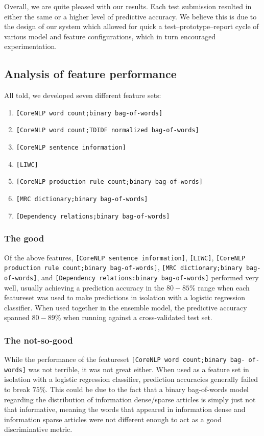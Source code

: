 \documentclass[
10pt, %
a4paper, %
oneside, %
headinclude,footinclude, %
BCOR5mm, %
]{scrartcl}
\begin{document}
Overall, we are quite pleased with our results. Each test submission resulted in
either the same or a higher level of predictive accuracy. We believe this is due
to the design of our system which allowed for quick a test--prototype--report
cycle of various model and feature configurations, which in turn encouraged
experimentation.

\subsection{Analysis of feature performance}
All told, we developed seven different feature sets: 
\begin{enumerate}
	\item \texttt{[CoreNLP word count;binary bag-of-words]} 
	\item \texttt{[CoreNLP word count;TDIDF normalized bag-of-words]} 
	\item \texttt{[CoreNLP sentence information]} 
	\item \texttt{[LIWC]}
	\item \texttt{[CoreNLP production rule count;binary bag-of-words]}
	\item \texttt{[MRC dictionary;binary bag-of-words]}
	\item \texttt{[Dependency relations;binary bag-of-words]}
\end{enumerate}

\subsubsection{The good}
Of the above features, \texttt{[CoreNLP sentence information]},
\texttt{[LIWC]}, \texttt{[CoreNLP production rule count;binary bag-of-words]}, 
\texttt{[MRC dictionary;binary bag-of-words]}, 
and \texttt{[Dependency relations:binary bag-of-words]} performed very well,
usually achieving a prediction accuracy in the $80-85\%$ range when each
featureset was used to make predictions in isolation with a logistic regression
classifier. When used together in the ensemble model, the predictive accuracy
spanned $80-89\%$ when running against a cross-validated test set.

\subsubsection{The not-so-good}
While the performance of the featureset \texttt{[CoreNLP word count;binary bag-
of-words]} was not terrible, it was not great either. When used as a feature set
in isolation with a logistic regression classifier, prediction accuracies
generally failed to break $75\%$. This could be due to the fact that a binary
bag-of-words model regarding the distribution of information dense/sparse
articles is simply just not that informative, meaning the words that appeared in
information dense and information sparse articles were not different enough to
act as a good discriminative metric.
\end{document}
